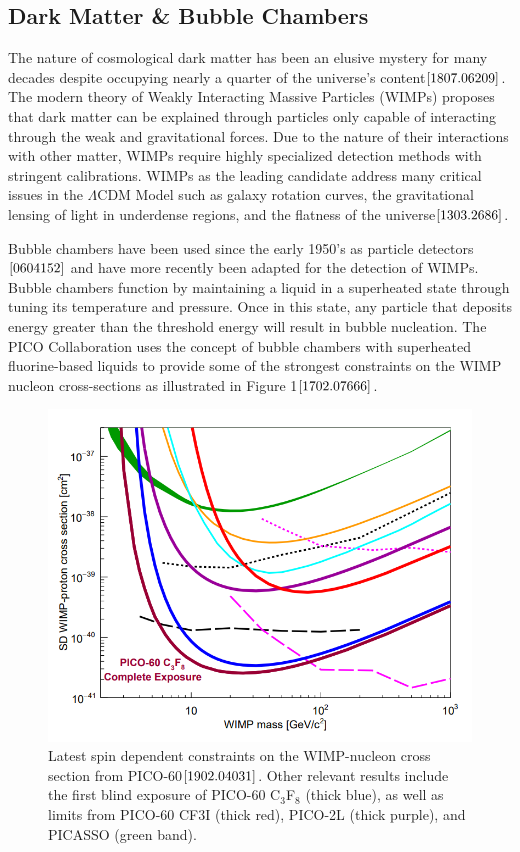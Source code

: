 \documentclass[%
12pt,
twoside,
reprint,
amsmath,amssymb,
aps,
]{article}
\begin{document}
	\subsection{Dark Matter \& Bubble Chambers}
	\par The nature of cosmological dark matter has been an elusive mystery for many decades despite occupying nearly a quarter of the universe's content${\cite{1807.06209}}$. The modern theory of Weakly Interacting Massive Particles (WIMPs) proposes that dark matter can be explained through particles only capable of interacting through the weak and gravitational forces. Due to the nature of their interactions with other matter, WIMPs require highly specialized detection methods with stringent calibrations. WIMPs as the leading candidate address many critical issues in the $\Lambda$CDM Model such as galaxy rotation curves, the gravitational lensing of light in underdense regions, and the flatness of the universe${\cite{1303.2686}}$. 
	\par Bubble chambers have been used since the early 1950's as particle detectors${\cite{0604152}}$ and have more recently been adapted for the detection of WIMPs. Bubble chambers function by maintaining a liquid in a superheated state through tuning its temperature and pressure. Once in this state, any particle that deposits energy greater than the threshold energy will result in bubble nucleation. The PICO Collaboration uses the concept of bubble chambers with superheated fluorine-based liquids to provide some of the strongest constraints on the WIMP nucleon cross-sections as illustrated in Figure 1${\cite{1702.07666}}$.
	
	\begin{figure}
		\includegraphics[scale = 0.4, center]{Images/constraints.png}
		\caption{\label{tab:table-name} Latest spin dependent constraints on the WIMP-nucleon cross section from PICO-60${\cite{1902.04031}}$. Other relevant results include the first blind exposure of PICO-60 C$_{3}$F$_{8}$ (thick blue), as well as limits from PICO-60 CF3I (thick red), PICO-2L (thick purple), and PICASSO (green band).}
	\end{figure}
	
\end{document}
